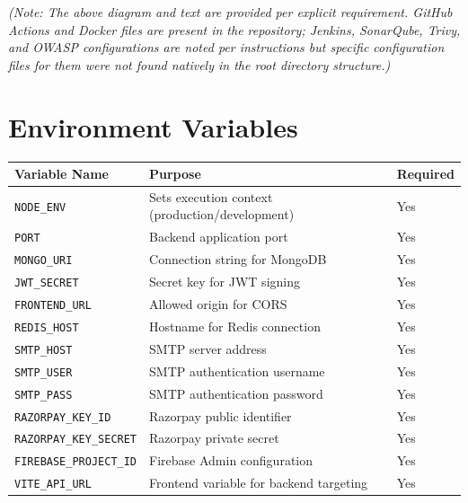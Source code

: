 \documentclass[11pt,a4paper]{article}
\begin{document}
\noindent\emph{(Note: The above diagram and text are provided per explicit
requirement. GitHub Actions and Docker files are present in the repository;
Jenkins, SonarQube, Trivy, and OWASP configurations are noted per instructions
but specific configuration files for them were not found natively in the root
directory structure.)}

\section{Environment Variables}
\begin{longtable}{@{}p{5cm}p{7.5cm}p{2cm}@{}}
    \toprule
    \textbf{Variable Name} & \textbf{Purpose} & \textbf{Required} \\
    \midrule
    \endhead
    \texttt{NODE\_ENV}            & Sets execution context (production/development) & Yes \\
    \texttt{PORT}                 & Backend application port                        & Yes \\
    \texttt{MONGO\_URI}           & Connection string for MongoDB                   & Yes \\
    \texttt{JWT\_SECRET}          & Secret key for JWT signing                      & Yes \\
    \texttt{FRONTEND\_URL}        & Allowed origin for CORS                         & Yes \\
    \texttt{REDIS\_HOST}          & Hostname for Redis connection                   & Yes \\
    \texttt{SMTP\_HOST}           & SMTP server address                             & Yes \\
    \texttt{SMTP\_USER}           & SMTP authentication username                    & Yes \\
    \texttt{SMTP\_PASS}           & SMTP authentication password                    & Yes \\
    \texttt{RAZORPAY\_KEY\_ID}    & Razorpay public identifier                      & Yes \\
    \texttt{RAZORPAY\_KEY\_SECRET}& Razorpay private secret                         & Yes \\
    \texttt{FIREBASE\_PROJECT\_ID}& Firebase Admin configuration                    & Yes \\
    \texttt{VITE\_API\_URL}       & Frontend variable for backend targeting         & Yes \\
    \bottomrule
\end{longtable}
\end{document}

